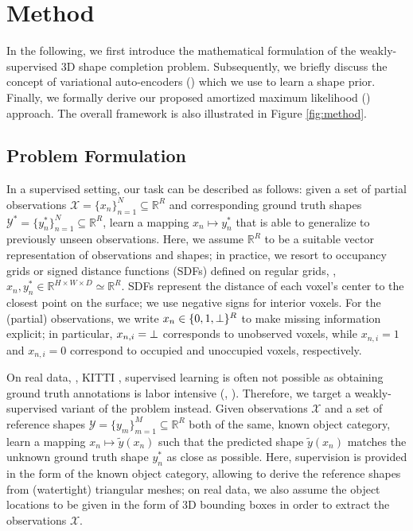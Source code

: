 \section{Method}
\label{sec:method}

In the following, we first introduce the mathematical formulation of the weakly-supervised 3D shape completion problem. Subsequently, we briefly discuss the concept of variational auto-encoders (\VAEs) \cite{Kingma2013ARXIV} which we use to learn a shape prior.
Finally, we formally derive our proposed amortized maximum likelihood (\AML) approach. The overall framework is also illustrated in Figure \ref{fig:method}.

\subsection{Problem Formulation}

In a supervised setting, our task can be described as follows: given a set of partial observations $\mathcal{X} = \{x_n\}_{n = 1}^N \subseteq \mathbb{R}^R$ and corresponding ground truth shapes $\mathcal{Y}^* = \{y_n^*\}_{n = 1}^N \subseteq \mathbb{R}^R$, learn a mapping $x_n \mapsto y_n^*$ that is able to generalize to previously unseen observations. Here, we assume $\mathbb{R}^R$ to be a suitable vector representation of observations and shapes; in practice, we resort to occupancy grids or signed distance functions (SDFs) defined on regular grids, \ie, $x_n, y_n^* \in \mathbb{R}^{H \times W \times D} \simeq \mathbb{R}^R$.
SDFs represent the distance of each voxel's center to the closest point on the surface; we use negative signs for interior voxels.
For the (partial) observations, we write $x_n \in \{0, 1, \bot\}^R$ to make missing information explicit; in particular, $x_{n,i} = \bot$ corresponds to unobserved voxels, while $x_{n,i} = 1$ and $x_{n,i} = 0$ correspond to occupied and unoccupied voxels, respectively.

On real data, \eg, KITTI \cite{Geiger2012CVPR}, supervised learning is often not possible as obtaining ground truth annotations is labor intensive (\eg, \cite{Menze2015CVPR,Xie2016CVPR}). Therefore, we target a weakly-supervised variant of the problem instead. Given observations $\mathcal{X}$ and a set of reference shapes $\mathcal{Y} = \{y_m\}_{m = 1}^M \subseteq \mathbb{R}^R$ both of the same, known object category, learn a mapping $x_n \mapsto \tilde{y}(x_n)$ such that the predicted shape $\tilde{y}(x_n)$ matches the unknown ground truth shape $y_n^*$ as close as possible.
Here, supervision is provided in the form of the known object category, allowing to derive the reference shapes from (watertight) triangular meshes; on real data, we also assume the object locations to be given in the form of 3D bounding boxes in order to extract the observations $\mathcal{X}$.

